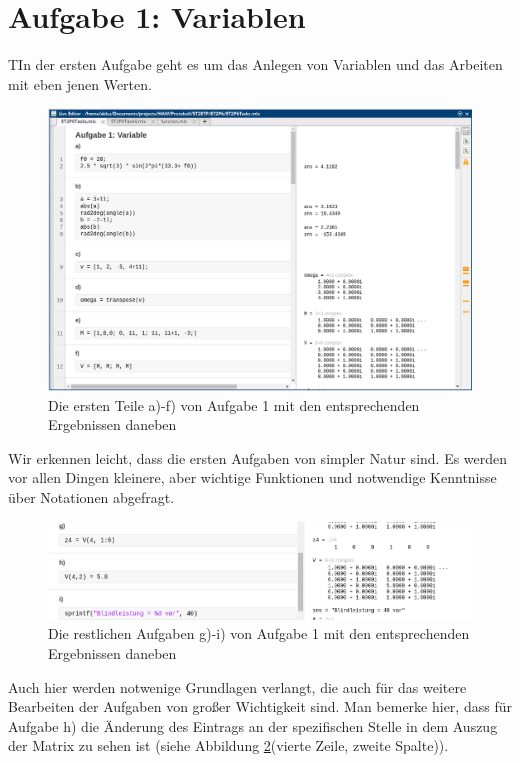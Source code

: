 \documentclass{article}
\begin{document}
\newpage
\thispagestyle{empty}

\tableofcontents


\newpage

\section{Aufgabe 1: Variablen}

\begin{task}
  TIn der ersten Aufgabe geht es um das Anlegen von Variablen und das Arbeiten mit eben jenen Werten.
\end{task}


\begin{figure}[h]
  \centering
  \includegraphics[width=\textwidth]{../assets/images/ET2P6/aufgaben1a_f.png}
  \caption{Die ersten Teile a)-f) von Aufgabe 1 mit den entsprechenden Ergebnissen daneben}
  \label{fig:auf1af}
\end{figure}
Wir erkennen leicht, dass die ersten Aufgaben von simpler Natur sind. Es werden vor allen Dingen kleinere, aber wichtige Funktionen und notwendige Kenntnisse über Notationen abgefragt.
\newpage
\begin{figure}[h]
  \centering
  \includegraphics[width=\textwidth]{../assets/images/ET2P6/aufgaben1g_i.png}
  \caption{Die restlichen Aufgaben g)-i) von Aufgabe 1 mit den entsprechenden Ergebnissen daneben}
  \label{fig:auf1gi}
\end{figure}
Auch hier werden notwenige Grundlagen verlangt, die auch für das weitere Bearbeiten der Aufgaben von großer Wichtigkeit sind. Man bemerke hier, dass für Aufgabe h) die Änderung des Eintrags an der spezifischen Stelle in dem Auszug der Matrix zu sehen ist (siehe Abbildung \ref{fig:auf1gi}(vierte Zeile, zweite Spalte)).
\end{document}

